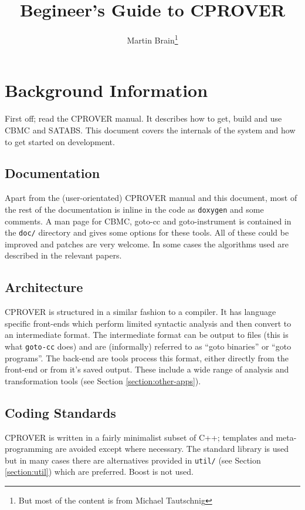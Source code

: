 \documentclass{article}
\title{Begineer's Guide to CPROVER}
\author{Martin Brain\thanks{But most of the content is from Michael Tautschnig}}
\newcommand{\dir}[1]{\texttt{#1}}
\begin{document}
\maketitle

\section{Background Information}

First off; read the CPROVER manual.  It describes how to get, build
and use CBMC and SATABS.  This document covers the internals of the
system and how to get started on development.


\subsection{Documentation}

Apart from the (user-orientated) CPROVER manual and this document,
most of the rest of the documentation is inline in the code
as \texttt{doxygen} and some comments.  A man page for CBMC, goto-cc
and goto-instrument is contained in the \dir{doc/} directory and gives
some options for these tools.  All of these could be improved
and patches are very welcome.  In some cases the algorithms used are
described in the relevant papers.

\subsection{Architecture}

CPROVER is structured in a similar fashion to a compiler.  It has
language specific front-ends which perform limited syntactic analysis
and then convert to an intermediate format.  The intermediate format
can be output to files (this is what \texttt{goto-cc} does) and are
(informally) referred to as ``goto binaries'' or ``goto programs''.
The back-end are tools process this format, either directly from the
front-end or from it's saved output.  These include a wide range of
analysis and transformation tools (see Section \ref{section:other-apps}).

\subsection{Coding Standards}

CPROVER is written in a fairly minimalist subset of C++; templates and
meta-programming are avoided except where necessary.  The standard
library is used but in many cases there are alternatives provided in
\dir{util/} (see Section \ref{section:util}) which are preferred.
Boost is not used.
\end{document}
